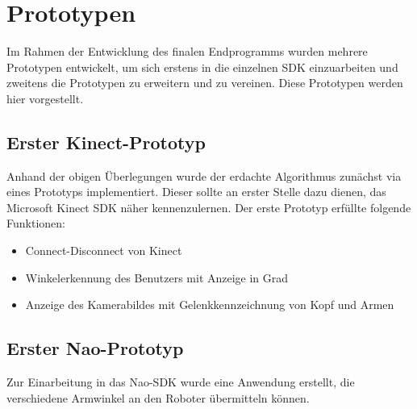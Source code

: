 \section{Prototypen}
Im Rahmen der Entwicklung des finalen Endprogramms wurden mehrere Prototypen entwickelt, um sich erstens in die einzelnen SDK einzuarbeiten und zweitens die Prototypen zu erweitern und zu vereinen. Diese Prototypen werden hier vorgestellt.

\subsection{Erster Kinect-Prototyp}
Anhand der obigen Überlegungen wurde der erdachte Algorithmus zunächst via eines Prototyps implementiert. Dieser sollte an erster Stelle dazu dienen, das Microsoft Kinect SDK näher kennenzulernen. Der erste Prototyp erfüllte folgende Funktionen:
\begin{itemize}
	\item Connect-Disconnect von Kinect
	\item Winkelerkennung des Benutzers mit Anzeige in Grad
	\item Anzeige des Kamerabildes mit Gelenkkennzeichnung von Kopf und Armen
\end{itemize}

\subsection{Erster Nao-Prototyp}
Zur Einarbeitung in das Nao-SDK wurde eine Anwendung erstellt, die verschiedene Armwinkel an den Roboter übermitteln können.

